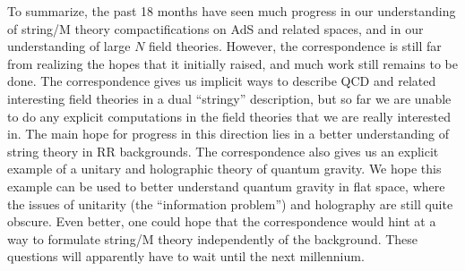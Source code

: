 To summarize, the past 18 months have seen much progress in our
understanding of string/M theory compactifications on AdS and related
spaces, and in our understanding of large $N$ field theories. However,
the correspondence is still far from realizing the hopes that it
initially raised, and much work still remains to be done. The
correspondence gives us implicit ways to describe QCD and related
interesting field theories in a dual ``stringy'' description, but so
far we are unable to do any explicit computations in the field
theories that we are really interested in. The main hope for progress
in this direction lies in a better understanding of string theory in
RR backgrounds. The correspondence also gives us an explicit example
of a unitary and holographic theory of quantum gravity. We hope this
example can be used to better understand quantum gravity in flat
space, where the issues of unitarity (the ``information problem'') and
holography are still quite obscure. Even better, one could hope that
the correspondence would hint at a way to formulate string/M theory
independently of the background. These questions will apparently have
to wait until the next millennium.






















